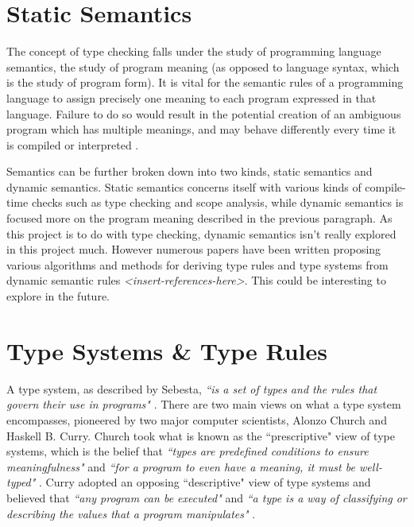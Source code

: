 \documentclass{UoYCSproject}
\begin{document}
\section{Static Semantics}
The concept of type checking falls under the study of programming language
semantics, the study of program meaning (as opposed to language syntax, which is
the study of program form). It is vital for the semantic rules of a programming
language to assign precisely one meaning to each program expressed in that
language. Failure to do so would result in the potential creation of an
ambiguous program which has multiple meanings, and may behave differently every
time it is compiled or interpreted \cite[p.~114]{Sebesta}.

Semantics can be further broken down into two kinds, static semantics and
dynamic semantics. Static semantics concerns itself with various kinds
of compile-time checks such as type checking and scope analysis, while dynamic
semantics is focused more on the program meaning described in the previous
paragraph. As this project is to do with type checking, dynamic semantics isn't
really explored in this project much. However numerous papers have been written
proposing various algorithms and methods for deriving type rules and type
systems from dynamic semantic rules \textit{<insert-references-here>}. This could
be interesting to explore in the future.

\section{Type Systems \& Type Rules}
\label{sec:Chap1TypeSystems}

A type system, as described by Sebesta, \textit{``is a set of types and the rules that
    govern their use in programs"} \cite[\S6, p.~309]{Sebesta}.
There are two main views on what a type system encompasses, pioneered by two
major computer scientists, Alonzo Church and Haskell B. Curry.
Church took what is known as the ``prescriptive" view of type systems, which is
the belief that \textit{``types are predefined conditions to ensure meaningfulness"}
and \textit{``for a program to even have a meaning, it must be well-typed"}
\cite{NeilJones}. Curry adopted an opposing ``descriptive" view of type systems
and believed that \textit{``any program can be executed"} and \textit{``a type
    is a way of classifying or describing the values that a program manipulates"}
\cite{NeilJones}.
\end{document}

